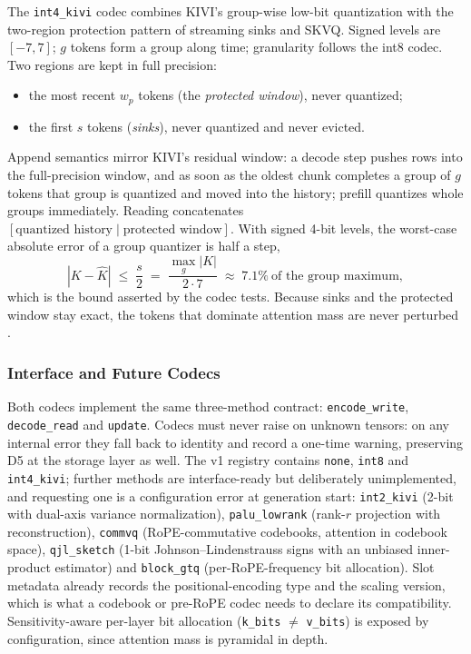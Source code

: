The \texttt{int4\_kivi} codec combines KIVI's group-wise low-bit quantization with the two-region protection pattern of streaming sinks and SKVQ. Signed levels are $[-7,7]$; $g$ tokens form a group along time; granularity follows the int8 codec. Two regions are kept in full precision:
\begin{itemize}[leftmargin=*]
    \item the most recent $w_p$ tokens (the \emph{protected window}), never quantized;
    \item the first $s$ tokens (\emph{sinks}), never quantized and never evicted.
\end{itemize}
Append semantics mirror KIVI's residual window: a decode step pushes rows into the full-precision window, and as soon as the oldest chunk completes a group of $g$ tokens that group is quantized and moved into the history; prefill quantizes whole groups immediately. Reading concatenates $[\text{quantized history}\mid\text{protected window}]$. With signed 4-bit levels, the worst-case absolute error of a group quantizer is half a step,
\[
|K-\hat{K}| \;\le\; \frac{s}{2} \;=\; \frac{\max_{g}|K|}{2\cdot 7} \;\approx\; 7.1\%\ \text{of the group maximum},
\]
which is the bound asserted by the codec tests. Because sinks and the protected window stay exact, the tokens that dominate attention mass are never perturbed \citep{kivi_liu_2024,kvquant_hooper_2024,skvq_duanmu_2024,xiao_streaming_sinks_2024}.

\subsubsection{Interface and Future Codecs}

Both codecs implement the same three-method contract: \texttt{encode\_write}, \texttt{decode\_read} and \texttt{update}. Codecs must never raise on unknown tensors: on any internal error they fall back to identity and record a one-time warning, preserving D5 at the storage layer as well. The v1 registry contains \texttt{none}, \texttt{int8} and \texttt{int4\_kivi}; further methods are interface-ready but deliberately unimplemented, and requesting one is a configuration error at generation start: \texttt{int2\_kivi} (2-bit with dual-axis variance normalization), \texttt{palu\_lowrank} (rank-$r$ projection with reconstruction), \texttt{commvq} (RoPE-commutative codebooks, attention in codebook space), \texttt{qjl\_sketch} (1-bit Johnson--Lindenstrauss signs with an unbiased inner-product estimator) and \texttt{block\_gtq} (per-RoPE-frequency bit allocation). Slot metadata already records the positional-encoding type and the scaling version, which is what a codebook or pre-RoPE codec needs to declare its compatibility. Sensitivity-aware per-layer bit allocation (\texttt{k\_bits} $\ne$ \texttt{v\_bits}) is exposed by configuration, since attention mass is pyramidal in depth.

